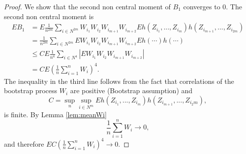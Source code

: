 \documentclass{article} %
\newcommand{\ev}{E}
\begin{document}
\begin{proof}
 We  show that the second non central moment of $B_1$ converges to $0$. The second non central moment is 
\begin{align*}
 \ev B_1 &= \ev \frac {1} {n^{2m}} \sum_{i \in N^{2m}}  W_{i_1} W_{i_2}  W_{i_{m+1}} W_{i_{m+2}} \ev h(Z_{i_1},...,Z_{i_m})  h(Z_{i_{m+1}},...,Z_{i_{2m}})\\
              &=\frac {1} {n^{2m}} \sum_{i \in N^{2m}} \ev W_{i_1} W_{i_2}  W_{i_{m+1}} W_{i_{m+2}}  \ev h(\cdots) h(\cdots)   \\
               & \leq  C \ev  \frac {1}  {n^4} \sum_{i \in N^4}  |\ev W_{i_1} W_{i_2}  W_{i_{m+1}} W_{i_{m+2}}|\\
              & = C \ev  \left( \frac {1}  {n}  \sum_{i=1}^n W_i \right)^4.
\end{align*}
The inequality in the third line follows from the fact that correlations of the bootstrap process $W_i$ are positive (Bootstrap assumption) and 
$$C = \sup_{n} \sup_{i \in N^m}\ev h(Z_{i_1},...,Z_{i_m})  h(Z_{i_{m+1}},...,Z_{i_2m}),$$ 
is finite. By Lemma \ref{lem:meanWi} 
\[
 \frac {1}  {n}  \sum_{i=1}^n W_i  \to 0,
\]
and therefore  $\ev C \left( \frac {1}  {n}  \sum_{i=1}^n W_i \right)^4 \to 0$.


\end{proof}
\end{document}
